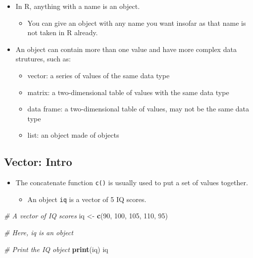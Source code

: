 \documentclass[
]{book}
\newenvironment{Shaded}{\begin{snugshade}}{\end{snugshade}}
\newcommand{\CommentTok}[1]{\textcolor[rgb]{0.56,0.35,0.01}{\textit{#1}}}
\newcommand{\DecValTok}[1]{\textcolor[rgb]{0.00,0.00,0.81}{#1}}
\newcommand{\FunctionTok}[1]{\textcolor[rgb]{0.13,0.29,0.53}{\textbf{#1}}}
\newcommand{\NormalTok}[1]{#1}
\newcommand{\OtherTok}[1]{\textcolor[rgb]{0.56,0.35,0.01}{#1}}
\providecommand{\tightlist}{%
  \setlength{\itemsep}{0pt}\setlength{\parskip}{0pt}}
\begin{document}
\begin{itemize}
\tightlist
\item
  In R, anything with a name is an object.

  \begin{itemize}
  \tightlist
  \item
    You can give an object with any name you want insofar as that name is not taken in R already.
  \end{itemize}
\item
  An object can contain more than one value and have more complex data strutures, such as:

  \begin{itemize}
  \tightlist
  \item
    vector: a series of values of the same data type
  \item
    matrix: a two-dimensional table of values with the same data type
  \item
    data frame: a two-dimensional table of values, may not be the same data type
  \item
    list: an object made of objects
  \end{itemize}
\end{itemize}

\subsection{Vector: Intro}\label{vector-intro}

\begin{itemize}
\tightlist
\item
  The concatenate function \texttt{c()} is usually used to put a set of values together.

  \begin{itemize}
  \tightlist
  \item
    An object \texttt{iq} is a vector of 5 IQ scores.
  \end{itemize}
\end{itemize}

\begin{Shaded}
\begin{Highlighting}[]
\CommentTok{\# A vector of IQ scores}
\NormalTok{iq }\OtherTok{\textless{}{-}} \FunctionTok{c}\NormalTok{(}\DecValTok{90}\NormalTok{, }\DecValTok{100}\NormalTok{, }\DecValTok{105}\NormalTok{, }\DecValTok{110}\NormalTok{, }\DecValTok{95}\NormalTok{)}

\CommentTok{\# Here, \textquotesingle{}iq\textquotesingle{} is an object}

\CommentTok{\# Print the IQ object}
\FunctionTok{print}\NormalTok{(iq)}
\NormalTok{iq}
\end{Highlighting}
\end{Shaded}
\end{document}
